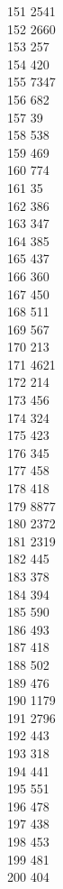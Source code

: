 { 151	2541 \\
 152	2660 \\
 153	257 \\
 154	420 \\
 155	7347 \\
 156	682 \\
 157	39 \\
 158	538 \\
 159	469 \\
 160	774 \\
 161	35 \\
 162	386 \\
 163	347 \\
 164	385 \\
 165	437 \\
 166	360 \\
 167	450 \\
 168	511 \\
 169	567 \\
 170	213 \\
 171	4621 \\
 172	214 \\
 173	456 \\
 174	324 \\
 175	423 \\
 176	345 \\
 177	458 \\
 178	418 \\
 179	8877 \\
 180	2372 \\
 181	2319 \\
 182	445 \\
 183	378 \\
 184	394 \\
 185	590 \\
 186	493 \\
 187	418 \\
 188	502 \\
 189	476 \\
 190	1179 \\
 191	2796 \\
 192	443 \\
 193	318 \\
 194	441 \\
 195	551 \\
 196	478 \\
 197	438 \\
 198	453 \\
 199	481 \\
 200	404 \\
}
